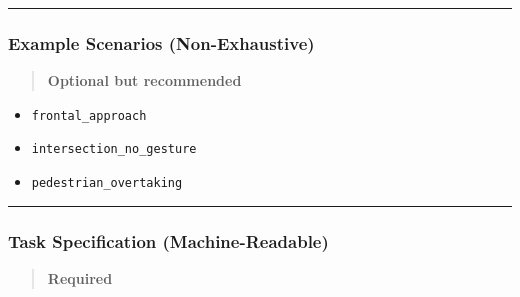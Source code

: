 \documentclass[utf8]{frontiers_suppmat} %
\providecommand{\tightlist}{%
  \setlength{\itemsep}{0pt}\setlength{\parskip}{0pt}}
\begin{document}
\begin{center}\rule{0.5\linewidth}{0.5pt}\end{center}

\subsubsection{Example Scenarios
(Non-Exhaustive)}\label{example-scenarios-non-exhaustive}

\begin{quote}
\textbf{Optional but recommended}
\end{quote}

\begin{itemize}
\tightlist
\item
  \texttt{frontal\_approach}
\item
  \texttt{intersection\_no\_gesture}
\item
  \texttt{pedestrian\_overtaking}
\end{itemize}

\begin{center}\rule{0.5\linewidth}{0.5pt}\end{center}

\subsubsection{Task Specification
(Machine-Readable)}\label{task-specification-machine-readable}

\begin{quote}
\textbf{Required}
\end{quote}
\end{document}
